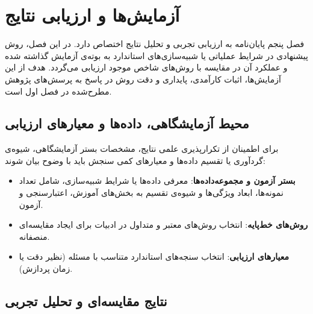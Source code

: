 

\chapter{آزمایش‌ها و ارزیابی نتایج}\label{chap:chapter5_experiments}

فصل پنجم پایان‌نامه به ارزیابی تجربی و تحلیل نتایج اختصاص دارد. در این فصل، روش پیشنهادی در شرایط عملیاتی یا شبیه‌سازی‌های استاندارد به بوته‌ی آزمایش گذاشته شده و عملکرد آن در مقایسه با روش‌های شاخص موجود ارزیابی می‌گردد. هدف از این آزمایش‌ها، اثبات کارآمدی، پایداری و دقت روش در پاسخ به پرسش‌های پژوهش مطرح‌شده در فصل اول است.


\section{محیط آزمایشگاهی، داده‌ها و معیارهای ارزیابی}\label{sec:5-1}

برای اطمینان از تکرارپذیری علمی نتایج، مشخصات بستر آزمایشگاهی، شیوه‌ی گردآوری یا تقسیم داده‌ها و معیارهای کمی سنجش باید با وضوح بیان شوند:
\begin{itemize}
    \item \textbf{بستر آزمون و مجموعه‌داده‌ها}: معرفی داده‌ها یا شرایط شبیه‌سازی، شامل تعداد نمونه‌ها، ابعاد ویژگی‌ها و شیوه‌ی تقسیم به بخش‌های آموزش، اعتبارسنجی و آزمون.
    \vspace{-0.25cm}
    \item \textbf{روش‌های خط‌پایه}: انتخاب روش‌های معتبر و متداول در ادبیات برای ایجاد مقایسه‌ای منصفانه.
    \vspace{-0.25cm}
    \item \textbf{معیارهای ارزیابی}: انتخاب سنجه‌های استاندارد متناسب با مسئله (نظیر دقت یا زمان پردازش).
\end{itemize}


\section{نتایج مقایسه‌ای و تحلیل تجربی}\label{sec:5-2}

